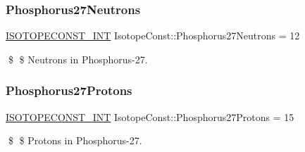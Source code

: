 \subsubsection{\texorpdfstring{Phosphorus27\+Neutrons}{Phosphorus27Neutrons}}
{\footnotesize\ttfamily \mbox{\hyperlink{group___isotope_const-_macros_ga5f18360b3e99483a35c32d789e62621c}{I\+S\+O\+T\+O\+P\+E\+C\+O\+N\+S\+T\+\_\+\+I\+NT}} Isotope\+Const\+::\+Phosphorus27\+Neutrons = 12}

\$ \$ Neutrons in Phosphorus-\/27. \mbox{\label{group___isotope_const-_phosphorus-_p27_ga513afaf9335a4cac4871af026b7b5509}} 
\subsubsection{\texorpdfstring{Phosphorus27\+Protons}{Phosphorus27Protons}}
{\footnotesize\ttfamily \mbox{\hyperlink{group___isotope_const-_macros_ga5f18360b3e99483a35c32d789e62621c}{I\+S\+O\+T\+O\+P\+E\+C\+O\+N\+S\+T\+\_\+\+I\+NT}} Isotope\+Const\+::\+Phosphorus27\+Protons = 15}

\$ \$ Protons in Phosphorus-\/27. 
